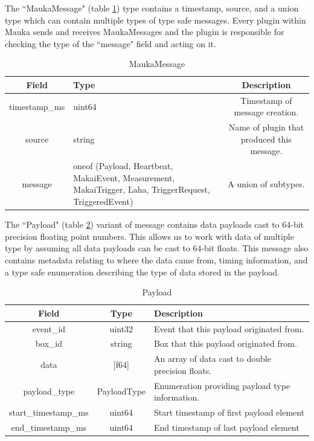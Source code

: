 The ``MaukaMessage" (table \ref{table:MaukaMessage}) type contains a timestamp, source, and a union type which can contain multiple types of type safe messages. Every plugin within Mauka sends and receives MaukaMessages and the plugin is responsible for checking the type of the ``message" field and acting on it.

\begin{table}[H]
	\centering
	\caption{MaukaMessage}
	\begin{tabular}{|c|p{6cm}|c|}
		\hline 
		Field & Type & Description  \\ 
		\hline 
		timestamp\_ms & uint64 & Timestamp of message creation.  \\ 
		\hline 
		source & string & Name of plugin that produced this message. \\ 
		\hline 
		message & oneof (Payload, Heartbeat, MakaiEvent, Measurement, MakaiTrigger, Laha, TriggerRequest, TriggeredEvent) & A union of subtypes. \\ 
		\hline 
	\end{tabular} 
	\label{table:MaukaMessage}
\end{table}

The ``Payload" (table \ref{table:Payload}) variant of message contains data payloads cast to 64-bit precision floating point numbers. This allows us to work with data of multiple type by assuming all data payloads can be cast to 64-bit floats. This message also contains metadata relating to where the data came from, timing information, and a type safe enumeration describing the type of data stored in the payload.

\begin{table}[H]
	\centering
	\caption{Payload}
	\begin{tabular}{|c|c| p{8cm} |}
		\hline 
		Field & Type & Description  \\ 
		\hline 
		event\_id & uint32 & Event that this payload originated from.  \\ 
		\hline 
		box\_id & string & Box that this payload originated from. \\ 
		\hline 
		data & [f64] & An array of data cast to double precision floats. \\ 
		\hline
		payload\_type & PayloadType & Enumeration providing payload type information. \\
		start\_timestamp\_ms & uint64 & Start timestamp of first payload element \\
		\hline
		end\_timestamp\_ms & uint64 & End timestamp of last payload element\\
		\hline 
	\end{tabular} 
	\label{table:Payload}
\end{table}

